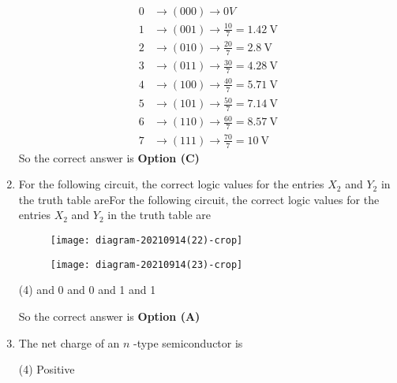 \begin{enumerate}
	\begin{answer}
		\begin{align*}
		0& \rightarrow(000) \rightarrow 0 V\\
		1& \rightarrow(001) \rightarrow \frac{10}{7}=1.42 \mathrm{~V}\\
		2& \rightarrow(010) \rightarrow \frac{20}{7}=2.8 \mathrm{~V}\\
		3& \rightarrow(011) \rightarrow \frac{30}{7}=4.28 \mathrm{~V}\\
		4& \rightarrow(100) \rightarrow \frac{40}{7}=5.71 \mathrm{~V}\\
		5& \rightarrow(101) \rightarrow \frac{50}{7}=7.14 \mathrm{~V}\\
		6& \rightarrow(110) \rightarrow \frac{60}{7}=8.57 \mathrm{~V}\\
		7& \rightarrow(111) \rightarrow \frac{70}{7}=10 \mathrm{~V}
		\end{align*}
		So the correct answer is \textbf{Option (C)}
	\end{answer}
	\item 	For the following circuit, the correct logic values for the entries $X_{2}$ and $Y_{2}$ in the truth table areFor the following circuit, the correct logic values for the entries $X_{2}$ and $Y_{2}$ in the truth table are
	{}\\
	\begin{minipage}{0.45\textwidth}
		\begin{figure}[H]
			\centering
			\texttt{[image: diagram-20210914(22)-crop]}
		\end{figure}
	\end{minipage}
	\begin{minipage}{0.45\textwidth}
		\begin{figure}[H]
			\centering
			\texttt{[image: diagram-20210914(23)-crop]}
		\end{figure}
	\end{minipage}
	\begin{tasks}(4)
		 and 0
		 and 0 
		 and 1
		 and 1
	\end{tasks}
	\begin{answer}
		So the correct answer is \textbf{Option (A)} 
	\end{answer}
	\item The net charge of an $n$ -type semiconductor is
	\begin{tasks}(4)
		\task[\textbf{A.}] Positive

\end{tasks}
\end{enumerate}
